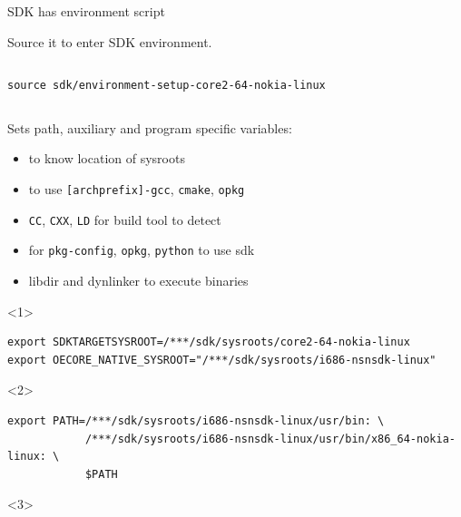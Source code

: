 \documentclass{beamer}
\begin{document}
\begin{frame}[fragile, t]{SDK has environment script}
    \begin{block}{}
        Source it to enter SDK environment. \\
        \begin{columns}
            \centering
            \begin{column}{.9\textwidth}
\begin{lstlisting}[style=TinyConsole]
source sdk/environment-setup-core2-64-nokia-linux
\end{lstlisting}
            \end{column}
        \end{columns}
    \end{block}
    \begin{block}{}
        Sets path, auxiliary and program specific variables:
        \begin{itemize}
            \scriptsize
            \item<1->{to know location of sysroots}
            \item<2->{to use \verb|[archprefix]-gcc|, \verb|cmake|, \verb|opkg|}
            \item<3->{\verb|CC|, \verb|CXX|, \verb|LD| for build tool to detect}
            \item<4->{for \verb|pkg-config|, \verb|opkg|, \verb|python| to use sdk}
            \item<5->{libdir and dynlinker to execute binaries}
        \end{itemize}
    \end{block}
    \begin{onlyenv}<1>
\begin{lstlisting}[style=TinyConsole]
export SDKTARGETSYSROOT=/***/sdk/sysroots/core2-64-nokia-linux
export OECORE_NATIVE_SYSROOT="/***/sdk/sysroots/i686-nsnsdk-linux"
\end{lstlisting}
    \end{onlyenv}
    \begin{onlyenv}<2>
\begin{lstlisting}[style=TinyConsole]
export PATH=/***/sdk/sysroots/i686-nsnsdk-linux/usr/bin: \
            /***/sdk/sysroots/i686-nsnsdk-linux/usr/bin/x86_64-nokia-linux: \
            $PATH
\end{lstlisting}
    \end{onlyenv}
    \begin{onlyenv}<3>
\begin{lstlisting}[style=TinyConsole]

\end{lstlisting}
\end{onlyenv}
\end{frame}
\end{document}
